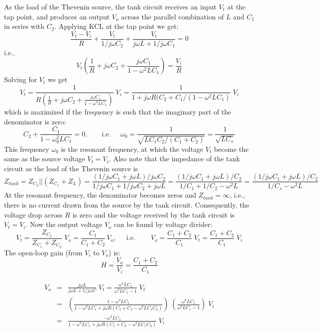 
As the load of the Thevenin source, the tank circuit receives an input 
$V_t$ at the tap point, and produces an output $V_o$ across the parallel
combination of $L$ and $C_1$ in series with $C_2$. Applying KCL at the tap 
point we get:
\[
\frac{V_t-V_i}{R}+\frac{V_t}{1/j\omega C_2}+\frac{V_t}{j\omega L+1/j\omega C_1}=0
\]
i.e.,
\[
V_t\left(\frac{1}{R}+j\omega C_2+\frac{j\omega C_1}{1-\omega^2LC_1}\right)
=\frac{V_i}{R}
\]
Solving for $V_t$ we get
\[
V_t=\frac{1}{R(\frac{1}{R}+j\omega C_2+\frac{j\omega C_1}
{1-\omega^2LC_1})}\;V_i
=\frac{1}{1+j\omega R(C_2+C_1/(1-\omega^2LC_1)}\;V_i
\]
which is maximized if the frequency is such that the imaginary part of 
the denominator is zero:
\[
C_2+\frac{C_1}{1-\omega_0^2LC_1}=0,\;\;\;\;\;\;\;\mbox{i.e.}\;\;\;\;\;
\omega_0=\frac{1}{\sqrt{LC_1C_2/(C_1+C_2)}}=\frac{1}{\sqrt{LC_s}}
\]
This frequency $\omega_0$ is the resonant frequency, at which the voltage 
$V_t$ become the same as the source voltage $V_t=V_i$. Also note that the 
impedance of the tank circuit as the load of the Thevenin source is
\[
Z_{tank}=Z_{C_2}||(Z_{C_1}+Z_L)=\frac{(1/j\omega C_1+j\omega L)/j\omega C_2}
{1/j\omega C_1+1/j\omega C_2+j\omega L}
=\frac{(1/j\omega C_1+j\omega L)/C_2}{1/C_1+1/C_2-\omega^2 L}
=\frac{(1/j\omega C_1+j\omega L)/C_2}{1/C_s-\omega^2 L}
\]
At the resonant frequency, the denominator becomes zeros and $Z_{tank}=\infty$,
i.e., there is no current drawn from the source by the tank circuit. 
Consequently, the voltage drop across $R$ is zero and the voltage received 
by the tank circuit is $V_t=V_i$. Now the output voltage $V_o$ can be found 
by voltage divider:
\[
V_t=\frac{Z_{C_2}}{Z_{C_1}+Z_{C_2}}\;V_o=\frac{C_1}{C_1+C_2}\,V_o,
\;\;\;\;\;\mbox{i.e.}\;\;\;\;\;\;\;\;
V_o=\frac{C_1+C_2}{C_1}\;V_t=\frac{C_1+C_2}{C_1}\;V_i
\]
The open-loop gain (from $V_i$ to $V_o$) is:
\[
H=\frac{V_o}{V_i}=\frac{C_1+C_2}{C_1}
\]

\begin{eqnarray}
  V_o&=&\frac{j\omega L}{j\omega L+1/j\omega C}\;V_t
  =\frac{\omega^2LC_1}{\omega^2LC_1-1}\;V_t
  \nonumber \\
  &=&\left(\frac{1-\omega^2LC_1}{1-\omega^2LC_1+j\omega R(C_1+C_2-\omega^2LC_1C_2)}\right)\;
  \left(\frac{\omega^2LC_1}{\omega^2LC_1-1}\right)\;V_i
  \nonumber \\
  &=&\frac{-\omega^2LC_1}{1-\omega^2LC_1+j\omega R(C_1+C_2-\omega^2LC_1C_2)}\;V_i
  \nonumber 
\end{eqnarray}

